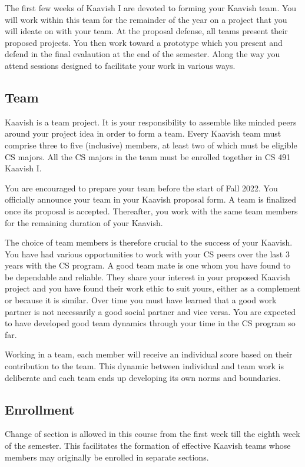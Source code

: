 \documentclass[a4paper]{article}
\newcommand{\new}[1]{{#1}}
\begin{document}
\new{The first few weeks of Kaavish I are devoted to forming your Kaavish team. You will work within this team for the remainder of the year on a project that you will ideate on with your team. At the proposal defense, all teams present their proposed projects. You then work toward a prototype which you present and defend in the final evalaution at the end of the semester. Along the way you attend sessions designed to facilitate your work in various ways.}


\subsection{Team}

Kaavish is a team project. It is your responsibility to assemble like minded peers around your project idea in order to form a team. Every Kaavish team must comprise three to five (inclusive) members, at least two of which must be eligible CS majors. All the CS majors in the team must be enrolled together in CS 491 Kaavish I. 

You are encouraged to prepare your team before the start of Fall 2022. You officially announce your team in your Kaavish proposal form. A team is finalized once its proposal is accepted. Thereafter, you work with the same team members for the remaining duration of your Kaavish.

The choice of team members is therefore crucial to the success of your Kaavish. You have had various opportunities to work with your CS peers over the last 3 years with the CS program. A good team mate is one whom you have found to be dependable and reliable. They share your interest in your proposed Kaavish project and you have found their work ethic to suit yours, either as a complement or because it is similar. Over time you must have learned that a good work partner is not necessarily a good social partner and vice versa. You are expected to have developed good team dynamics through your time in the CS program so far.

Working in a team, each member will receive an individual score based on their contribution to the team. This dynamic between individual and team work is deliberate and each team ends up developing its own norms and boundaries.

\subsection{Enrollment}

Change of section is allowed in this course from the first week till the eighth week of the semester. This facilitates the formation of effective Kaavish teams whose members may originally be enrolled in separate sections.
\end{document}
